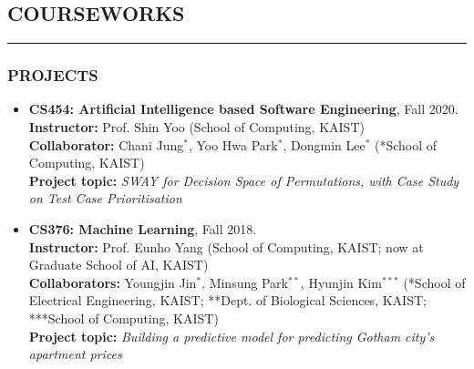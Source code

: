 \documentclass[10pt,a4]{article}
\newcounter{myEnumCounter}
\newcounter{mySaveCounter}
\renewenvironment{enumerate}{%
  \begin{list}{\arabic{myEnumCounter}.}{\usecounter{myEnumCounter}%
  \setcounter{myEnumCounter}{\value{mySaveCounter}}}
  }{%
  \setcounter{mySaveCounter}{\value{myEnumCounter}}\end{list}%
}
\newcommand\myEnumReset{\setcounter{mySaveCounter}{0}}
\begin{document}
\begin{small}



\subsection*{COURSEWORKS}
\hrule
\vspace{0.2cm}

\subsubsection*{PROJECTS}
\begin{itemize}
	
	\item {\bf CS454: Artificial Intelligence based Software Engineering}, Fall 2020. \\
	{\bf Instructor:} Prof. Shin Yoo (School of Computing, KAIST) \\
	{\bf Collaborator:} Chani Jung$^{*}$, Yoo Hwa Park$^{*}$, Dongmin Lee$^{*}$ (*School of Computing, KAIST) \\
	{\bf Project topic:} {\it SWAY for Decision Space of Permutations, with Case Study on Test Case Prioritisation} \\
	
	\item {\bf CS376: Machine Learning}, Fall 2018. \\
	{\bf Instructor:} Prof. Eunho Yang (School of Computing, KAIST; now at Graduate School of AI, KAIST) \\
	{\bf Collaborators:} Youngjin Jin$^{*}$, Minsung Park$^{**}$, Hyunjin Kim$^{***}$ (*School of Electrical Engineering, KAIST; **Dept. of Biological Sciences, KAIST; ***School of Computing, KAIST) \\
	{\bf Project topic:} {\it Building a predictive model for predicting Gotham city's apartment prices} \\
	

\end{itemize}
\end{small}
\end{document}
